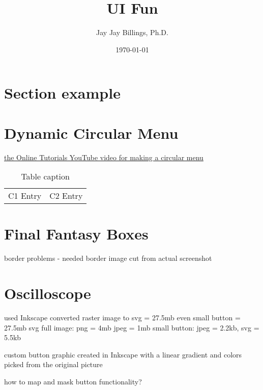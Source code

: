 \documentclass{article}
\title{UI Fun}
\author{Jay Jay Billings, Ph.D.}
\date{\today}
\begin{document}
\maketitle

\section*{Section example}

\section{Dynamic Circular Menu}
\href{https://www.youtube.com/watch?v=ShPPkZEeLPo}{the Online Tutorials YouTube video for making a circular menu}

\begin{table}[h!]
\centering
\begin{tabularx}{ 0.8\textwidth }{ | >{\raggedright\arraybackslash}X | >{\centering\arraybackslash}X | }
 \hline
 \multicolumn{2}{|c|}{Table title} \\
 \hline
 C1 Entry & C2 Entry \\
 \hline
\end{tabularx}
\caption{Table caption}
\end{table}
\section{Final Fantasy Boxes}
border problems - needed border image cut from actual screenshot


\section{Oscilloscope}

used Inkscape
converted raster image to svg = 27.5mb
even small button = 27.5mb svg
full image:
png = 4mb
jpeg = 1mb
small button:
jpeg = 2.2kb, svg = 5.5kb

custom button graphic created in Inkscape with a linear gradient and colors picked from the original picture

how to map and mask button functionality?
\end{document}
